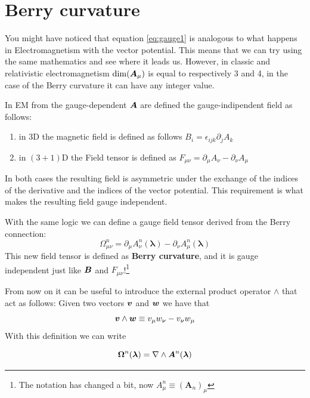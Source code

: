\section{Berry curvature}
    You might have noticed that equation \ref{eq:gauge1} is analogous to what happens in Electromagnetism with the vector potential. This means that we can try using the same mathematics and see where it leads us. However, in classic and relativistic electromagnetism $\dim(\boldsymbol{A}_\mu)$ is equal to respectively 3 and 4, in the case of the Berry curvature it can have any integer value.

    In EM from the gauge-dependent $\boldsymbol{A}$ are defined the gauge-indipendent field as follows:
    \begin{enumerate}
        \item in $3$D the magnetic field is defined as follows $B_i=\epsilon_{ijk} \partial_j A_k$
        \item in $(3+1)$D the Field tensor is defined as $F_{\mu\nu}=\partial_\mu A_\nu-\partial_\nu A_\mu$
    \end{enumerate}
    In both cases the resulting field is asymmetric under the exchange of the indices of the derivative and the indices of the vector potential. This requirement is what makes the resulting field gauge independent.
    
    With the same logic we can define a gauge field tensor derived from the Berry connection:
    \begin{equation}
        \label{eq:berry-curvature1}
        \boxed{
            \Omega_{\mu\nu}^n =\partial_\mu A^n_\nu(\boldsymbol \lambda) - \partial_\nu A^n_\mu(\boldsymbol \lambda)
        }
    \end{equation}
    This new field tensor is defined as \textbf{Berry curvature}, and it is gauge independent just like 
    $\boldsymbol{B}$ and $F_{\mu\nu}$!\footnote{The notation has changed a bit, now $A_\mu^n\equiv (\mathbf A_n)_\mu$}

    From now on it can be useful to introduce the external product operator $\wedge$ that act as follows:
    Given two vectors $\boldsymbol{v}$ and $\boldsymbol{w}$ we have that
    \begin{equation}
        \boldsymbol{v}\wedge \boldsymbol{w}\equiv v_\mu w_\nu-v_\nu w_\mu
    \end{equation}
    With this definition we can write

    \begin{equation}
        \boldsymbol \Omega^n(\boldsymbol \lambda)=\nabla \wedge \boldsymbol{A}^n(\boldsymbol \lambda)
    \end{equation}

